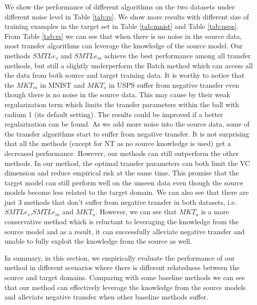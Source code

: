 We show the performance of different algorithms on the two datasets under different noise level in Table \ref{tab:rs}. We show more results with different size of training examples in the target set in Table \ref{tab:mnist} and Table \ref{tab:usps}. From Table \ref{tab:rs} we can see that when there is no noise in the source data, most transfer algorithms can leverage the knowledge of the source model. Our methods $SMTLe_s$ and $SMTLe_m$ achieve the best performance among all transfer methods, but still a slightly underperform the Batch method which can access all the data from both source and target training data. It is worthy to notice that the $MKT_m$ in MNIST and $MKT_s$ in USPS suffer from negative transfer even though there is no noise in the source data. This may cause by their weak regularization term which limits the transfer parameters within the ball with radium 1 (its default setting). The results could be improved if a better regularization can be found. As we add more noise into the source data, some of the transfer algorithms start to suffer from negative transfer. It is not surprising that all the methods (except for NT as no source knowledge is used) get a decreased performance. However, our methods can still outperform the other methods. In our method, the optimal transfer parameters can both limit the VC dimension and reduce empirical risk at the same time. This promise that the target model can still perform well on the unseen data even though the source models become less related to the target domain. We can also see that there are just 3 methods that don't suffer from negative transfer in both datasets, i.e. $SMTLe_s$,$SMTLe_m$ and $MKT_a$. However, we can see that $MKT_a$ is a more conservative method which is reluctant to leveraging the knowledge from the source model and as a result, it can successfully alleviate negative transfer and unable to fully exploit the knowledge from the source as well.

In summary, in this section, we empirically evaluate the performance of our method in different scenarios where there is different relatedness between the source and target domains. Comparing with some baseline methods we can see that our method can effectively leverage the knowledge from the source models and alleviate negative transfer when other baseline methods suffer.



